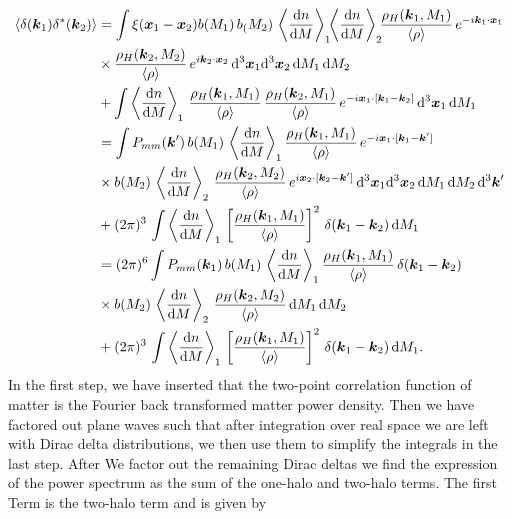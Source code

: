 \documentclass[../main.tex]{subfiles}
\begin{document}
\begin{align}
    \langle \delta(\boldsymbol{k}_1)\delta^*(\boldsymbol{k}_2)\rangle &=  \int \xi(\boldsymbol{x}_1-\boldsymbol{x}_2) b(M_1)\, b_(M_2)\, \left\langle \frac{\mathrm{d} n}{\mathrm{d} M} \right\rangle_1\!\!\left\langle \frac{\mathrm{d} n}{\mathrm{d} M} \right\rangle_2 \!\!\frac{\rho_H(\boldsymbol{k}_1,M_1)}{\langle \rho \rangle}\,e^{-i\boldsymbol{k}_1\cdot\boldsymbol{x}_1} \nonumber \\
    &\times \frac{\rho_H(\boldsymbol{k}_2,M_2)}{\langle \rho \rangle}\,e^{i\boldsymbol{k}_2\cdot\boldsymbol{x}_2} \, \mathrm{d}^3{\boldsymbol{x}}_1 \mathrm{d}^3{\boldsymbol{x}}_2 \,\mathrm{d} M_1\,\mathrm{d} M_2 \nonumber\\
    &+\int \left\langle \frac{\mathrm{d} n}{\mathrm{d} M} \right\rangle_1\,\frac{\rho_H(\boldsymbol{k}_1,M_1)}{\langle \rho \rangle}\,\frac{\rho_H(\boldsymbol{k}_2,M_1)}{\langle \rho \rangle}\,e^{-i\boldsymbol{x}_1\cdot[\boldsymbol{k}_1-\boldsymbol{k}_2]} \,\mathrm{d}^3 \boldsymbol{x}_1 \,\mathrm{d} M_1 \\
    &=  \int P_{mm}(\boldsymbol{k}') \, b(M_1)\, \left\langle \frac{\mathrm{d} n}{\mathrm{d} M} \right\rangle_1 \frac{\rho_H(\boldsymbol{k}_1,M_1)}{\langle \rho \rangle}\,e^{-i \boldsymbol{x}_1\cdot[\boldsymbol{k}_1-\boldsymbol{k}']} \nonumber \\
    &\times  b(M_2)\,\left\langle\frac{\mathrm{d} n}{\mathrm{d} M} \right\rangle_2\,\frac{\rho_H(\boldsymbol{k}_2,M_2)}{\langle \rho \rangle}\,e^{i\boldsymbol{x}_2\cdot[\boldsymbol{k}_2-\boldsymbol{k}']} \, \mathrm{d}^3{\boldsymbol{x}}_1 \mathrm{d}^3{\boldsymbol{x}}_2 \,\mathrm{d} M_1\,\mathrm{d} M_2\,\mathrm{d}^3\boldsymbol{k}' \nonumber\\
    &+(2\pi)^3\,\int \left\langle \frac{\mathrm{d} n}{\mathrm{d} M} \right\rangle_1\,\left[\frac{\rho_H(\boldsymbol{k}_1,M_1)}{\langle \rho \rangle}\right]^2\,\delta(\boldsymbol{k}_1-\boldsymbol{k}_2) \,\mathrm{d} M_1 \\
    &= (2\pi)^6 \int P_{mm}(\boldsymbol{k}_1) \, b(M_1)\, \left\langle \frac{\mathrm{d} n}{\mathrm{d} M} \right\rangle_1 \frac{\rho_H(\boldsymbol{k}_1,M_1)}{\langle \rho \rangle}\,\delta(\boldsymbol{k}_1-\boldsymbol{k}_2) \nonumber \\
    &\times  b(M_2)\,\left\langle\frac{\mathrm{d} n}{\mathrm{d} M} \right\rangle_2\,\frac{\rho_H(\boldsymbol{k}_2,M_2)}{\langle \rho \rangle} \,\mathrm{d} M_1\,\mathrm{d} M_2\nonumber\\
    &+(2\pi)^3\,\int \left\langle \frac{\mathrm{d} n}{\mathrm{d} M} \right\rangle_1\,\left[\frac{\rho_H(\boldsymbol{k}_1,M_1)}{\langle \rho \rangle}\right]^2\,\delta(\boldsymbol{k}_1-\boldsymbol{k}_2)\,\mathrm{d} M_1.
\end{align}
In the first step, we have inserted that the two-point correlation function of matter is the Fourier back transformed matter power density. Then we have factored out plane waves such that after integration over real space we are left with Dirac delta distributions, we then use them to simplify the integrals in the last step. After We factor out the remaining Dirac deltas we find the expression of the power spectrum as the sum of the one-halo and two-halo terms. The first Term is the two-halo term and is given by 
\end{document}
